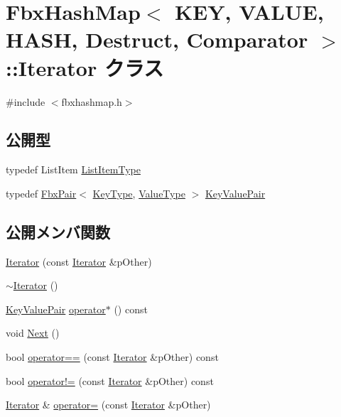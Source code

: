 \hypertarget{class_fbx_hash_map_1_1_iterator}{}\section{Fbx\+Hash\+Map$<$ K\+EY, V\+A\+L\+UE, H\+A\+SH, Destruct, Comparator $>$\+:\+:Iterator クラス}
\label{class_fbx_hash_map_1_1_iterator}


{\ttfamily \#include $<$fbxhashmap.\+h$>$}

\subsection*{公開型}
\begin{DoxyCompactItemize}
\item 
typedef List\+Item \hyperlink{class_fbx_hash_map_1_1_iterator_a586b3cba7926b5b3cc39b9f581fdeb3f}{List\+Item\+Type}
\item 
typedef \hyperlink{class_fbx_pair}{Fbx\+Pair}$<$ \hyperlink{class_fbx_hash_map_ab56799173b6c58b676a94370b64ddbb0}{Key\+Type}, \hyperlink{class_fbx_hash_map_a9c4cfd0138aa9233c119403f3cc85501}{Value\+Type} $>$ \hyperlink{class_fbx_hash_map_1_1_iterator_a2a68388bbedcb2e86a927259561fc1d4}{Key\+Value\+Pair}
\end{DoxyCompactItemize}
\subsection*{公開メンバ関数}
\begin{DoxyCompactItemize}
\item 
\hyperlink{class_fbx_hash_map_1_1_iterator_a481aed412a6d384dfc6757d6f95e7b23}{Iterator} (const \hyperlink{class_fbx_hash_map_1_1_iterator}{Iterator} \&p\+Other)
\item 
\hyperlink{class_fbx_hash_map_1_1_iterator_ad8ad3f62e162fecdc73305f0221e54a2}{$\sim$\+Iterator} ()
\item 
\hyperlink{class_fbx_hash_map_1_1_iterator_a2a68388bbedcb2e86a927259561fc1d4}{Key\+Value\+Pair} \hyperlink{class_fbx_hash_map_1_1_iterator_a0ab28ebe60b4c300d3ebf092d80b3ab3}{operator$\ast$} () const
\item 
void \hyperlink{class_fbx_hash_map_1_1_iterator_a258bdc83ad94b6b15dae8c8206123fdb}{Next} ()
\item 
bool \hyperlink{class_fbx_hash_map_1_1_iterator_aeeba00ddc25c531558c29608ef10d478}{operator==} (const \hyperlink{class_fbx_hash_map_1_1_iterator}{Iterator} \&p\+Other) const
\item 
bool \hyperlink{class_fbx_hash_map_1_1_iterator_a092b6ea2a37710015462f1a9ad986741}{operator!=} (const \hyperlink{class_fbx_hash_map_1_1_iterator}{Iterator} \&p\+Other) const
\item 
\hyperlink{class_fbx_hash_map_1_1_iterator}{Iterator} \& \hyperlink{class_fbx_hash_map_1_1_iterator_a2bacfdaa8a84d7f5bf41447bc35ccc31}{operator=} (const \hyperlink{class_fbx_hash_map_1_1_iterator}{Iterator} \&p\+Other)
\end{DoxyCompactItemize}
